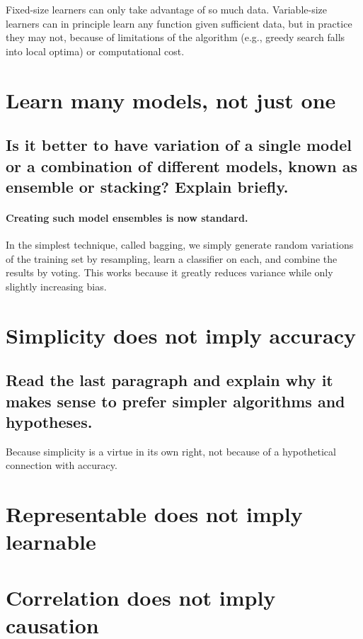 \documentclass[10pt]{article}
\begin{document}
Fixed-size learners can only take advantage of so much data. Variable-size
learners can in principle learn any function given sufficient data, but in
practice they may not, because of limitations of the algorithm (e.g., greedy
search falls into local optima) or computational cost.

\section{Learn many models, not just one}

\subsection*{Is it better to have variation of a single model or a combination
of different models, known as ensemble or stacking? Explain briefly.}

\paragraph{Creating such model ensembles is now standard.} In the simplest
technique, called bagging, we simply generate random variations of the training
set by resampling, learn a classifier on each, and combine the results by
voting. This works because it greatly reduces variance while only slightly
increasing bias.

\section{Simplicity does not imply accuracy}

\subsection{Read the last paragraph and explain why it makes sense to prefer
simpler algorithms and hypotheses.}

Because simplicity is a virtue in its own right, not because of a hypothetical connection with accuracy.

\section{Representable does not imply learnable}

\section{Correlation does not imply causation}
\end{document}

